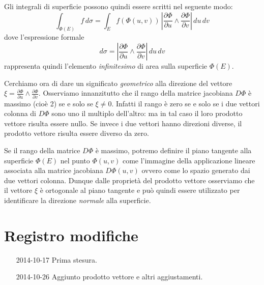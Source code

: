\documentclass[italian,a4paper]{scrartcl}
\begin{document}
Gli integrali di superficie possono quindi essere scritti nel seguente
modo:
\[
\int_{\Phi(E)} f\, d\sigma
=\int_E f(\Phi(u,v))\, 
\left\vert \frac{\partial \Phi}{\partial u} \wedge
\frac{\partial \Phi}{\partial v}\right\vert\, 
du\, dv
\]
dove l'espressione formale
\[
d\sigma = \left\vert \frac{\partial \Phi}{\partial u} \wedge
\frac{\partial \Phi}{\partial v}\right\vert\, 
du\, dv
\]
rappresenta quindi l'elemento \emph{infinitesimo} di area sulla
superficie $\Phi(E)$.

Cerchiamo ora di dare un significato \emph{geometrico} alla direzione 
del vettore
$\xi
= \frac{\partial \Phi}{\partial u} \wedge
\frac{\partial \Phi}{\partial v}$.
Osserviamo innanzitutto che il rango della matrice jacobiana $D\Phi$ è
massimo (cioè 2) se e solo se $\xi \neq 0$. Infatti il rango è zero se
e solo se i due vettori colonna di $D \Phi$ sono uno il multiplo
dell'altro: ma in tal caso il loro prodotto vettore risulta essere
nullo. Se invece i due vettori hanno direzioni diverse, il prodotto
vettore risulta essere diverso da zero.

Se il rango della matrice $D\Phi$ è massimo,
potremo definire il piano tangente alla superficie $\Phi(E)$ nel punto
$\Phi(u,v)$ come
l'immagine della applicazione lineare associata alla matrice jacobiana
$D\Phi(u,v)$ ovvero come lo spazio generato dai due vettori colonna.
Dunque dalle proprietà del prodotto vettore osserviamo che il vettore
$\xi$ è ortogonale al piano tangente e può quindi essere
utilizzato per identificare la direzione \emph{normale} alla superficie.

\section*{Registro modifiche}
\begin{itemize}
\item[2014-10-17] Prima stesura.
\item[2014-10-26] Aggiunto prodotto vettore e altri aggiustamenti.
\end{itemize}
\end{document}

